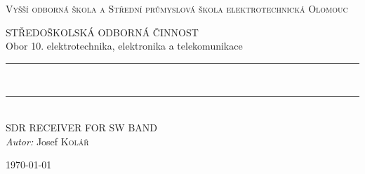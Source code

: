 \begin{titlepage}
  \begin{center}

  \textsc{\LARGE Vyšší odborná škola a Střední průmyslová škola elektrotechnická Olomouc}

  \begin{figure}[H]
    \centering
    
  \end{figure}

  \textsc{\Large STŘEDOŠKOLSKÁ ODBORNÁ ČINNOST}\\[0.5cm]
  Obor 10. elektrotechnika, elektronika a telekomunikace\\[.2cm]
	
  \rule{\linewidth}{0.5mm} \\[.4\linewidth]
  
  {
    \huge \bfseries \thetitle
  }

  \rule{\linewidth}{0.5mm} \\[.4\linewidth]
  
  SDR RECEIVER FOR SW BAND\\[1.5cm]
		
  \emph{Autor:} Josef \textsc{Kolář}
  
  \vfill

  {\large \today}

  \end{center}
\end{titlepage}

